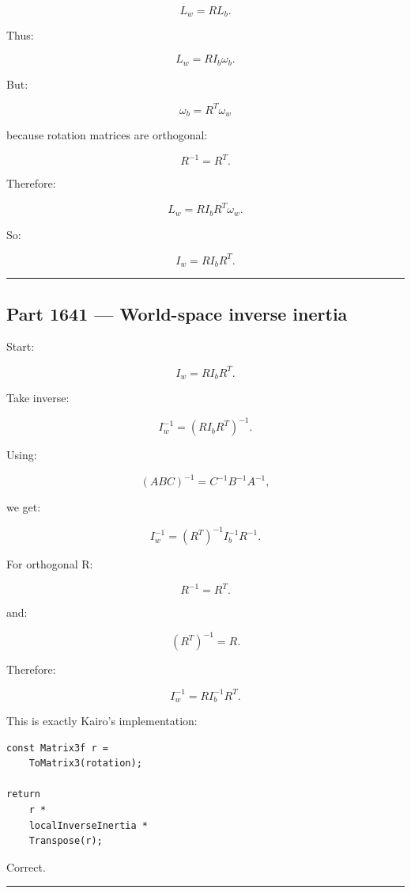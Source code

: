 \[
L_w=
RL_b.
\]

Thus:

\[
L_w=
RI_b\omega_b.
\]

But:

\[
\omega_b=
R^T\omega_w
\]

because rotation matrices are orthogonal:

\[
R^{-1}=R^T.
\]

Therefore:

\[
L_w=
RI_bR^T\omega_w.
\]

So:

\[
I_w=
RI_bR^T.
\]

\begin{center}\rule{0.5\linewidth}{0.5pt}\end{center}

\subsection{Part 1641 --- World-space inverse inertia}\label{06-engine-ii-ch035-part-1641-world-space-inverse-inertia}

\hypertarget{06-engine-ii-ch035-part-1641-world-space-inverse-inertia}{}

Start:

\[
I_w
=
RI_bR^T.
\]

Take inverse:

\[
I_w^{-1}
=
(RI_bR^T)^{-1}.
\]

Using:

\[
(ABC)^{-1}
=
C^{-1}B^{-1}A^{-1},
\]

we get:

\[
I_w^{-1}
=
(R^T)^{-1}
I_b^{-1}
R^{-1}.
\]

For orthogonal R:

\[
R^{-1}=R^T.
\]

and:

\[
(R^T)^{-1}=R.
\]

Therefore:

\[
\boxed{
I_w^{-1}
=
R
I_b^{-1}
R^T.
}
\]

This is exactly Kairo's implementation:

\begin{verbatim}
const Matrix3f r =
    ToMatrix3(rotation);

return
    r *
    localInverseInertia *
    Transpose(r);
\end{verbatim}

Correct.

\begin{center}\rule{0.5\linewidth}{0.5pt}\end{center}

